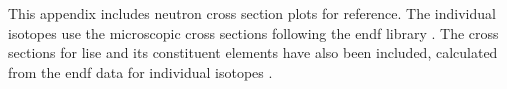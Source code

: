 \documentclass[../../main.tex]{subfiles}
\begin{document}
%
    \Xsection%
    This appendix includes neutron cross section plots for reference.
    The individual isotopes use the microscopic cross sections following the \gls{endf} library \cite{Chadwick_2011}.
    The cross sections for \gls{lise} and its constituent elements have also been included, calculated from the \gls{endf} data for individual isotopes \cite{book:Duderstadt_1976,book:Lewis_2008}.
\end{document}
